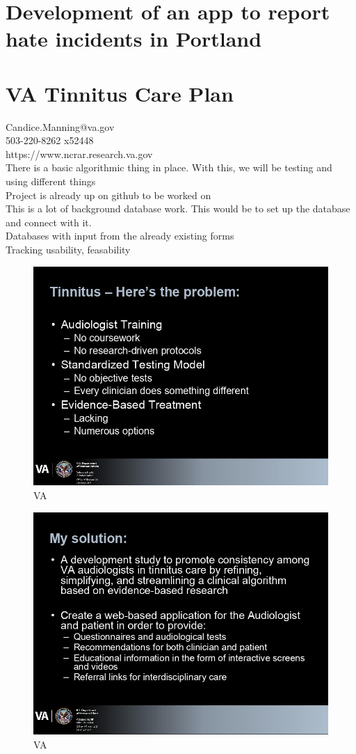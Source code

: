 \section*{Development of an app to report hate incidents in Portland}

\newpage
\section*{VA Tinnitus Care Plan}

Candice.Manning@va.gov\\
503-220-8262 x52448\\
https://www.ncrar.research.va.gov\\

There is a basic algorithmic thing in place.  With this, we will be testing and using different things\\
Project is already up on github to be worked on\\
This is a lot of background database work.  This would be to set up the database and connect with it.\\
Databases with input from the already existing forms\\
Tracking usability, feasability\\

\begin{figure}[h!]
\centering
\includegraphics[width=0.8\linewidth]{P2-a.jpg}
\caption[VA]{VA}
\label{fig:VA}
\end{figure}	
\newpage
\begin{figure}[h!]
\centering
\includegraphics[width=0.8\linewidth]{P2-b.jpg}
\caption[VA]{VA}
\label{fig:VA}
\end{figure}	

